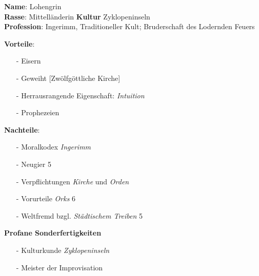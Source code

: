 \documentclass{article}
\begin{document}
\begin{mycolorbox}
      \textbf{Name}: Lohengrin\\
      \textbf{Rasse}: Mittelländerin \hfill \textbf{Kultur} Zyklopeninseln\\
      \textbf{Profession}: Ingerimm, Traditioneller Kult; Bruderschaft des Lodernden Feuers
\end{mycolorbox}

\begin{mycolorbox}
	\textbf{Vorteile}:
	\begin{itemize}
		\item[-] Eisern
		\item[-] Geweiht [Zwölfgöttliche Kirche]
		\item[-] Herrausrangende Eigenschaft: \textit{Intuition}
		\item[-] Prophezeien
	\end{itemize}
	\textbf{Nachteile}:
	\begin{itemize}
		\item[-] Moralkodex \textit{Ingerimm}
		\item[-] Neugier 5
		\item[-] Verpflichtungen \textit{Kirche} und \textit{Orden}
		\item[-] Vorurteile \textit{Orks} 6
		\item[-] Weltfremd bzgl. \textit{Städtischem Treiben} 5
	\end{itemize}
	\textbf{Profane Sonderfertigkeiten}
	\begin{itemize}
		\item[-] Kulturkunde \textit{Zyklopeninseln}
		\item[-] Meister der Improvisation
	\end{itemize}
\end{mycolorbox}
\end{document}
